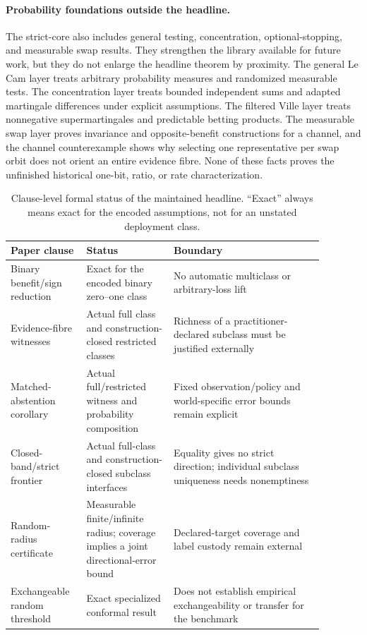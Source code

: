 \paragraph{Probability foundations outside the headline.}
The strict-core also includes general testing, concentration, optional-stopping, and measurable
swap results.  They strengthen the library available for future work, but they do not enlarge the
headline theorem by proximity.  The general Le Cam layer treats arbitrary probability measures
and randomized measurable tests.  The concentration layer treats bounded independent sums and
adapted martingale differences under explicit assumptions.  The filtered Ville layer treats
nonnegative supermartingales and predictable betting products.  The measurable swap layer proves
invariance and opposite-benefit constructions for a channel, and the channel counterexample shows
why selecting one representative per swap orbit does not orient an entire evidence fibre.  None of
these facts proves the unfinished historical one-bit, ratio, or rate characterization.

\begin{table}[t]
\centering
\small
\caption{Clause-level formal status of the maintained headline.  ``Exact'' always means exact for
the encoded assumptions, not for an unstated deployment class.}
\label{fr:tab-formal-status}
\begin{tabular}{>{\raggedright\arraybackslash}p{0.20\linewidth}
                >{\raggedright\arraybackslash}p{0.25\linewidth}
                >{\raggedright\arraybackslash}p{0.43\linewidth}}
\toprule
Paper clause & Status & Boundary \\
\midrule
Binary benefit/sign reduction & Exact for the encoded binary zero--one class & No automatic
multiclass or arbitrary-loss lift \\
Evidence-fibre witnesses & Actual full class and construction-closed restricted classes
& Richness of a practitioner-declared subclass must be justified externally \\
Matched-abstention corollary & Actual full/restricted witness and probability composition
& Fixed observation/policy and world-specific error bounds remain explicit \\
Closed-band/strict frontier & Actual full-class and construction-closed subclass interfaces
& Equality gives no strict direction; individual subclass uniqueness needs nonemptiness \\
Random-radius certificate & Measurable finite/infinite radius; coverage implies a joint
directional-error bound & Declared-target coverage and label custody remain external \\
Exchangeable random threshold & Exact specialized conformal result & Does not establish empirical
exchangeability or transfer for the benchmark \\
\bottomrule
\end{tabular}
\end{table}

